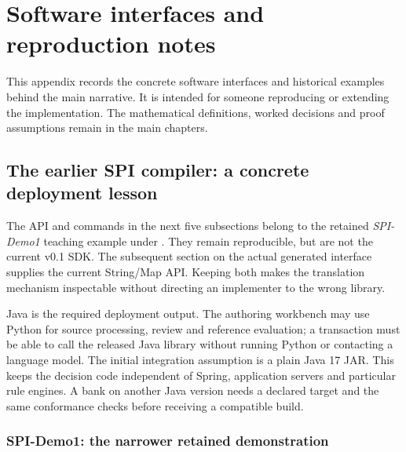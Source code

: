 \chapter{Software interfaces and reproduction notes}
\label{app:technical-reference}

This appendix records the concrete software interfaces and historical examples
behind the main narrative. It is intended for someone reproducing or extending
the implementation. The mathematical definitions, worked decisions and proof
assumptions remain in the main chapters.

\section{The earlier SPI compiler: a concrete deployment lesson}

The API and commands in the next five subsections belong to the retained
\emph{SPI-Demo1} teaching example under . They remain
reproducible, but are not the current v0.1 SDK. The subsequent section on the actual
generated interface supplies the current String/Map API. Keeping both makes the
translation mechanism inspectable without directing an implementer to the wrong
library.


\label{merge:P-03d-java-delivery:00}

\label{sec:java}

Java is the required deployment output. The authoring workbench may use Python
for source processing, review and reference evaluation; a transaction must be
able to call the released Java library without running Python or contacting a
language model. The initial integration assumption is a plain Java 17 JAR.
This keeps the decision code independent of Spring, application servers and
particular rule engines. A bank on another Java version needs a declared target
and the same conformance checks before receiving a compatible build.

\subsection{SPI-Demo1: the narrower retained demonstration}
\label{merge:P-03d-java-delivery:01}


